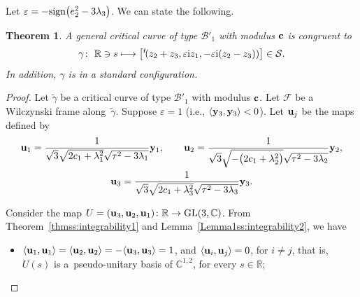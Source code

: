 \documentclass[pdftex]{sigma}
\numberwithin{equation}{section}
\newtheorem{thmx}{Theorem} %
\def\C{\mathbb{C}}
\def\R{\mathbb{R}}
\def\S{\mathcal{S}}
\def\S{\mathcal{S}}
\begin{document}
Let $\varepsilon =-{\rm sign}\big(e_2^2-3\lambda_3\big)$.
%
We can state the following.

\begin{thmx} \label{Theorem1ss:integrability2} %
A general critical curve of type ${\mathcal B}'_1$ with modulus ${\bf c}$ is congruent to
\begin{equation}\label{standard}
\gamma\colon \ \R \ni s \longmapsto \big[{^t\!(}z_2+z_3,\varepsilon {\rm i}z_1,-\varepsilon {\rm i}(z_2-z_3))\big]\in \S.\end{equation}
In addition, $\gamma$ is in a standard configuration.
\end{thmx}

\begin{proof}
Let $\widetilde{\gamma}$ be a critical curve of type ${\mathcal B}'_1$ with modulus ${\bf c}$. Let ${\mathcal F}$ be
a
Wilczynski frame along~$\widetilde{\gamma}$. Suppose $\varepsilon =1$ (i.e., $\langle {\bf y}_3,{\bf y}_3\rangle<0$).
Let ${\bf u}_j$ be the maps defined by
 \begin{gather*}
{\bf u}_1=\frac{1}{\sqrt{3}\sqrt{2c_1+\lambda_1^2}\sqrt{\tau^2-3\lambda_1}}{\bf y}_1,\qquad
{\bf u}_2=\frac{1}{\sqrt{3}\sqrt{-\big(2c_1+\lambda_2^2\big)}\sqrt{\tau^2-3\lambda_2}}{\bf y}_2,\\
{\bf u}_3=\frac{1}{\sqrt{3}\sqrt{2c_1+\lambda_3^2}\sqrt{\tau^2-3\lambda_3}}{\bf y}_3.
\end{gather*}

Consider the map
${U}=({\bf u}_3,{\bf u}_2, {\bf u}_1)\colon\R\to {\rm GL}(3,\C)$.
From Theorem~\ref{thmss:integrability1}
and Lemma~\ref{Lemma1ss:integrability2}, we have
\begin{itemize}\itemsep=0pt
\item $\langle {\bf u}_1,{\bf u}_1 \rangle= \langle {\bf u}_2,{\bf u}_2 \rangle=-\langle {\bf u}_3,{\bf u}_3 \rangle
 =1$, and $\langle {\bf u}_i,{\bf u}_j\rangle = 0$, for $i\neq j$, that is, ${U}(s)$ is a~pseudo-unitary
 basis of $\C^{1,2}$, for every $s\in \R$;


\end{itemize}
\end{proof}
\end{document}
